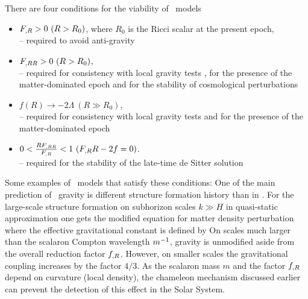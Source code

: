 There are four conditions for the viability of \fR\ models \parencite{Amendola_2007}
\begin{itemize}
	\item $F_{,R}>0\ (R>R_0)$, where $R_0$ is the Ricci scalar at the present epoch,\\
	-- required to avoid anti-gravity \parencite{2010deto.book.....A}\\
	\item $F_{,RR}>0\ (R>R_0)$,\\
	-- required for consistency with local gravity tests \parencite{2005gr.qc.....5136O}, for the presence of the matter-dominated epoch \parencite{2007PhRvL..98m1302A} and for the stability of cosmological perturbations \parencite{2007PhRvD..75d4004S}\\
	\item $f(R)\rightarrow -2\Lambda\ (R\gg R_0)$,\\
	-- required for consistency with local gravity tests \parencite{2008PhRvD..77b3507T} and for the presence of the matter-dominated epoch \parencite{Amendola_2007}\\
	\item $0<\frac{RF_{,RR}}{F_{,R}}<1\ (F_{,R} R-2f=0)$.\\
	-- required for the stability of the late-time de Sitter solution \parencite{1988PhLB..202..198M}
\end{itemize}
Some examples of \fR\ models that satisfy these conditions:
One of the main prediction of \fR\ gravity is different structure formation history than in \LCDM. For the large-scale structure formation on subhorizon scales \mbox{$k\gg H$} in quasi-static approximation one gets the modified equation for matter density perturbation \parencite{2011RSPTA.369.4947B}
where the effective gravitational constant is defined by
On scales much larger than the scalaron Compton wavelength $m^{-1}$, gravity is unmodified aside from the overall reduction factor $f_{,R}$. However, on smaller scales the gravitational coupling increases by the factor $4/3$. As the scalaron mass $m$ and the factor $f_{,R}$ depend on curvature (local density), the chameleon mechanism discussed earlier can prevent the detection of this effect in the Solar System.

